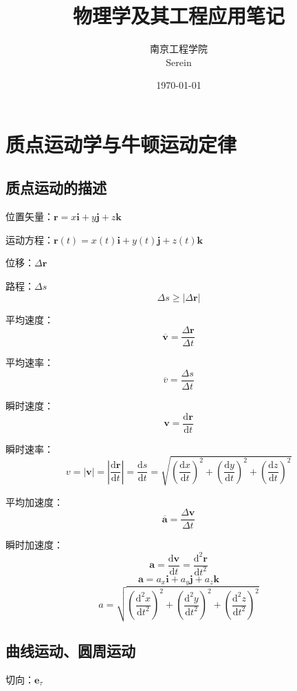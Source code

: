 \documentclass[12pt, a4paper, twoside]{ctexbook}
\title{{\Huge{\textbf{物理学及其工程应用笔记}}}}
\author{南京工程学院\\Serein}
\date{\today}
\begin{document}
\maketitle

\newpage
{} 
\setcounter{page}{1}
\tableofcontents
\newpage
\setcounter{page}{1}

\chapter{质点运动学与牛顿运动定律}
\newpage
\section{质点运动的描述}
{\sonti 位置矢量}：$\boldsymbol{r}=x\boldsymbol{i}+y\boldsymbol{j}+z\boldsymbol{k}$

{\sonti 运动方程}：$\boldsymbol{r}\left(t\right)=x\left(t\right)\boldsymbol{i}+y\left(t\right)\boldsymbol{j}+z\left(t\right)\boldsymbol{k}$

{\sonti 位移}：$\Delta \boldsymbol{r}$

{\sonti 路程}：$\Delta s$
$$
\Delta s \geqslant \left|\Delta \boldsymbol{r}\right|
$$

{\sonti 平均速度}：
$$
\overline{\boldsymbol{v}}=\frac{\Delta \boldsymbol{r}}{\Delta t}
$$

{\sonti 平均速率}：
$$
\overline{v}=\frac{\Delta s}{\Delta t}
$$

{\sonti 瞬时速度}：
$$
\boldsymbol{v}=\frac{\mathrm{d}\boldsymbol{r}}{\mathrm{d}t}
$$

{\sonti 瞬时速率}：
$$
v=\left|\boldsymbol{v}\right|=\left|\frac{\mathrm{d}\boldsymbol{r}}{\mathrm{d}t}\right|=\frac{\mathrm{d}s}{\mathrm{d}t}=\sqrt{\left(\frac{\mathrm{d}x}{\mathrm{d}t}\right)^2+\left(\frac{\mathrm{d}y}{\mathrm{d}t}\right)^2+\left(\frac{\mathrm{d}z}{\mathrm{d}t}\right)^2}
$$

{\sonti 平均加速度}：
$$
\overline{\boldsymbol{a}}=\frac{\Delta \boldsymbol{v}}{\Delta t}
$$

{\sonti 瞬时加速度}：
$$
\boldsymbol{a}=\frac{\mathrm{d}\boldsymbol{v}}{\mathrm{d}t}= \frac{\mathrm{d}^2\boldsymbol{r}}{\mathrm{d}t^2}
$$
$$
\boldsymbol{a}=a_x\boldsymbol{i}+a_y\boldsymbol{j}+a_z\boldsymbol{k}
$$
$$
a=\sqrt{\left(\frac{\mathrm{d}^2x}{\mathrm{d}t^2}\right)^2+\left(\frac{\mathrm{d}^2y}{\mathrm{d}t^2}\right)^2+\left(\frac{\mathrm{d}^2z}{\mathrm{d}t^2}\right)^2}
$$
\section{曲线运动、圆周运动}
{\sonti 切向}：$\boldsymbol{e}_\tau$
\end{document}
